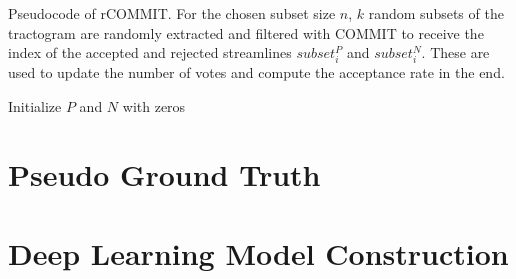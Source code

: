 \begin{algorithm}
    \caption{Pseudocode of rCOMMIT. For the chosen subset size $n$, $k$ random subsets of the tractogram are randomly extracted and filtered with COMMIT to 
    receive the index of the accepted and rejected streamlines $subset_i^P$ and $subset_i^N$. These are used to update the number of votes and compute the acceptance rate in the end.}
    
    
    
    \BlankLine
    \BlankLine
    Initialize $P$ and $N$ with zeros\\
    \label{fig:algo}
    
\end{algorithm}


\section{Pseudo Ground Truth}

\section{Deep Learning Model Construction}





